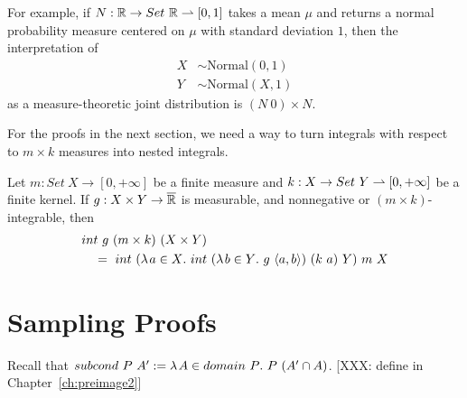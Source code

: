 For example, if $N : \mathbb{R} \to Set~\mathbb{R} \rightharpoonup [0,1]$ takes a mean $\mu$ and returns a normal probability measure centered on $\mu$ with standard deviation $1$, then the interpretation of
\begin{equation}
\begin{aligned}
	X &\sim \mathrm{Normal}(0,1)
\\
	Y &\sim \mathrm{Normal}(X,1)
\end{aligned}
\end{equation}
as a measure-theoretic joint distribution is $(N~0) \times N$.

For the proofs in the next section, we need a way to turn integrals with respect to $m \times k$ measures into nested integrals.

\begin{lemma}
\label{lem:fubini-for-transition-kernels}
Let $m : Set~X \to [0,+\infty]$ be a finite measure and $k : X \to Set~Y \rightharpoonup [0,+\infty]$ be a finite kernel.
If $g : X \times Y \to \cl{\Re}$ is measurable, and nonnegative or $(m \times k)$-integrable, then
\begin{equation}
\begin{aligned}
	&int~g~(m \times k)~(X \times Y)
\\
	&\tab =\ 
	int~(\fun{a \in X} int~(\fun{b \in Y} g~\pair{a,b})~(k~a)~Y)~m~X
\end{aligned}
\end{equation}
\end{lemma}


\section{Sampling Proofs}
\label{sec:sampling-proofs}

Recall that $subcond~P~A' := \lambda\mspace{2mu}{A \in domain~P}\ldotp\, P~(A' \cap A)$. [XXX: define in Chapter~\ref{ch:preimage2}]


